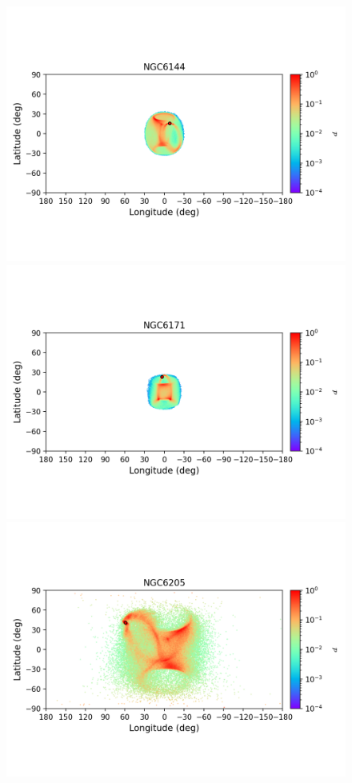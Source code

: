         \begin{figure}
        \includegraphics[clip=true, trim = 0mm 20mm 0mm 10mm, width=1\columnwidth]{images/error_plots_NGC6144.png}
        \includegraphics[clip=true, trim = 0mm 20mm 0mm 10mm, width=1\columnwidth]{images/error_plots_NGC6171.png}
        \includegraphics[clip=true, trim = 0mm 20mm 0mm 10mm, width=1\columnwidth]{images/error_plots_NGC6205.png}

\end{figure}
